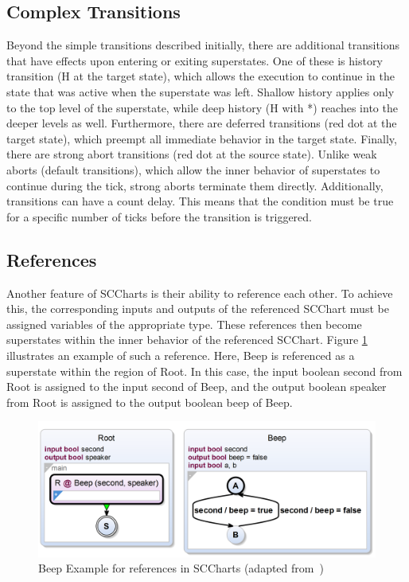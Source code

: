 \subsection{Complex Transitions}
Beyond the simple transitions described initially, there are additional transitions that have effects upon entering or exiting superstates. One of these is history transition (H at the target state), which allows the execution to continue in the state that was active when the superstate was left. Shallow history applies only to the top level of the superstate, while deep history (H with *) reaches into the deeper levels as well. Furthermore, there are deferred transitions (red dot at the target state), which preempt all immediate behavior in the target state. Finally, there are strong abort transitions (red dot at the source state). Unlike weak aborts (default transitions), which allow the inner behavior of superstates to continue during the tick, strong aborts terminate them directly.
Additionally, transitions can have a count delay. This means that the condition must be true for a specific number of ticks before the transition is triggered.~\cite{Motika.2017}

\subsection{References}
Another feature of SCCharts is their ability to reference each other. To achieve this, the corresponding inputs and outputs of the referenced SCChart must be assigned variables of the appropriate type. These references then become superstates within the inner behavior of the referenced SCChart. Figure \ref{fig:Beep-Reference} illustrates an example of such a reference. Here, Beep is referenced as a superstate within the region of Root. In this case, the input boolean second from Root is assigned to the input second of Beep, and the output boolean speaker from Root is assigned to the output boolean beep of Beep.
\begin{figure}[h!]
\centering
\includegraphics[width=1.0\textwidth]{bilder/BEEP_Reference_Example.png}
\caption{Beep Example for references in SCCharts (adapted from~\cite{.04.09.2023})}
\label{fig:Beep-Reference}
\end{figure} 

